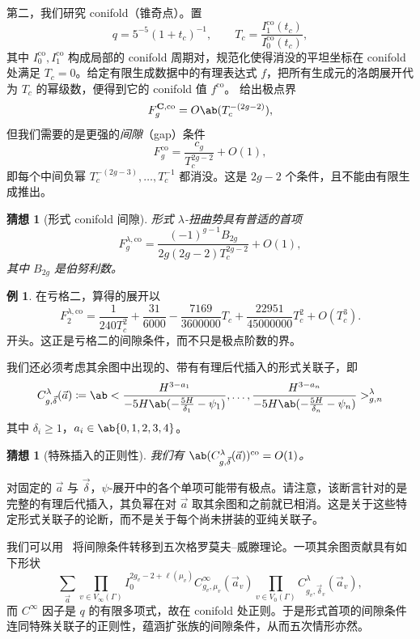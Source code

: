 \documentclass{amsart}
\newtheorem{conj}[thm]{猜想}
\theoremstyle{definition}
\newtheorem{exm}[thm]{例}
\theoremstyle{remark}
\theoremstyle{plain}
\theoremstyle{definition}
\theoremstyle{remark}
\newcommand{\mbf}[1]{\mathbf{#1}}
\newcommand{\mr}[1]{\mathrm{#1}}
\newcommand{\1}{\mathbf{1}}
\newcommand{\2}{\mathbf{2}}
\newcommand{\3}{\mathbf{3}}
\begin{document}
第二，我们研究 conifold（锥奇点）。置
\[ q = 5^{-5}(1+t_c)^{-1}, \qquad T_c = \frac{I_1^{\mr{co}}(t_c)}{I_0^{\mr{co}}(t_c)}, \]
其中 \(I_0^{\mr{co}}, I_1^{\mr{co}}\) 构成局部的 conifold 周期对，规范化使得消没的平坦坐标在 conifold 处满足 \(T_c = 0\)。给定有限生成数据中的有理表达式 \(f\)，把所有生成元的洛朗展开代为 \(T_c\) 的幂级数，便得到它的 conifold 值 \(f^{\mr{co}}\)。 给出极点界
\[ F_g^{\mbf{C},\mr{co}} = O\ab(T_c^{-(2g-2)}), \]
但我们需要的是更强的\textit{间隙}（gap）条件
\[ F_g^{\mr{co}} = \frac{c_g}{T_c^{2g-2}} + O(1), \]
即每个中间负幂 \(T_c^{-(2g-3)}, \ldots, T_c^{-1}\) 都消没。这是 \(2g-2\) 个条件，且不能由有限生成推出。

\begin{conj}[形式 conifold 间隙]%
\label{conj:formal conifold gap}
    形式 \(\lambda\)-扭曲势具有普适的首项
    \[ F_g^{\lambda,\mr{co}} = \frac{(-1)^{g-1}B_{2g}}{2g(2g-2)T_c^{2g-2}} + O(1), \]
    其中 \(B_{2g}\) 是伯努利数。
\end{conj}

\begin{exm}
    在亏格二，算得的展开以
    \[ F_2^{\lambda,\mr{co}} = \frac{1}{240T_c^2} + \frac{31}{6000} - \frac{7169}{3600000}T_c + \frac{22951}{45000000}T_c^2 + O(T_c^3). \]
    开头。这正是亏格二的间隙条件，而不只是极点阶数的界。
\end{exm}

我们还必须考虑其余图中出现的、带有有理后代插入的形式关联子，即
\[ C^{\lambda}_{g,\vec{\delta}}(\vec{a}) \coloneqq \ab< \frac{H^{3-a_1}}{-5H\ab(-\frac{5H}{\delta_1}-\psi_1)}, \ldots, \frac{H^{3-a_n}}{-5H\ab(-\frac{5H}{\delta_n}-\psi_n)}>^{\lambda}_{g,n} \]
其中 \(\delta_i \geq 1\)，\(a_i \in \ab\{0,1,2,3,4\}\)。

\begin{conj}[特殊插入的正则性]%
\label{conj:special correlator regularity}
    我们有 \(\ab(C^{\lambda}_{g,\vec{\delta}}(\vec{a}))^{\mr{co}} = O(1)\)。
\end{conj}

对固定的 \(\vec{a}\) 与 \(\vec{\delta}\)，\(\psi\)-展开中的各个单项可能带有极点。请注意，该断言针对的是完整的有理后代插入，其负幂在对 \(\vec{a}\) 取其余图和之前就已相消。这是关于这些特定形式关联子的论断，而不是关于每个尚未拼装的亚纯关联子。

我们可以用~ 将间隙条件转移到五次格罗莫夫–威滕理论。一项其余图贡献具有如下形状
\[ \sum_{\vec{a}} \prod_{v \in V_{\infty}(\Gamma)}I_0^{2g_v-2+\ell(\mu_v)}C^{\infty}_{g_v,\mu_v}(\vec{a}_v)\prod_{v\in V_0(\Gamma)}C^{\lambda}_{g_v,\vec{\delta}_v}(\vec{a}_v), \]
而 \(C^{\infty}\) 因子是 \(q\) 的有限多项式，故在 conifold 处正则。于是形式首项的间隙条件连同特殊关联子的正则性，蕴涵扩张族的间隙条件，从而五次情形亦然。
\end{document}
